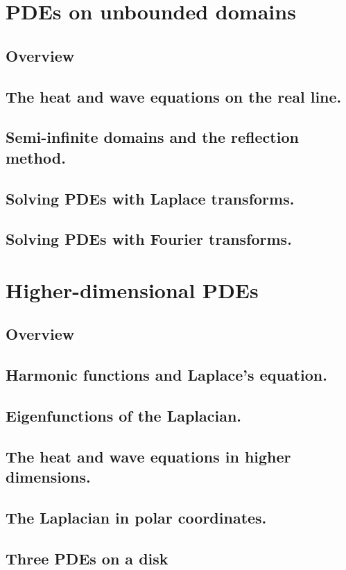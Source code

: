 \documentclass{article}
\begin{document}
\section{PDEs on unbounded domains}
\subsection*{Overview}
\subsection{The heat and wave equations on the real line.}
\subsection{Semi-infinite domains and the reflection method.}
\subsection{Solving PDEs with Laplace transforms.}
\subsection{Solving PDEs with Fourier transforms.}
\pagebreak
\section{Higher-dimensional PDEs}
\subsection*{Overview}
\subsection{Harmonic functions and Laplace's equation.}
\subsection{Eigenfunctions of the Laplacian.}
\subsection{The heat and wave equations in higher dimensions.}
\subsection{The Laplacian in polar coordinates.}
\subsection{Three PDEs on a disk}
\end{document}
